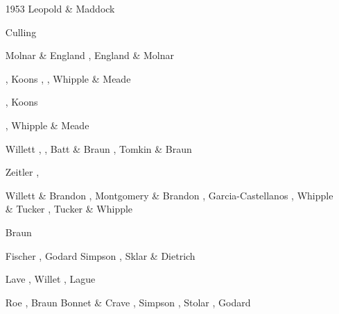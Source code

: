 \begin{scriptsize}
\begin{itemize}
\item [1953] Leopold \& Maddock \cite{lema53}
\item [\nineteensixty] Culling \cite{cull60}
\item [\nineteenninety] Molnar \& England \cite{moen90}, England \& Molnar \cite{enmo90}
\item [\nineteenninetytwo] \cite{befh92}\cite{chas92}
\item [\nineteenninetythree] \cite{povp93}\cite{wibf93}
\item [\nineteenninetyfour] \cite{howa94}, Koons \cite{koon94}, \cite{kobe94}\cite{gikb94}, 
                             Whipple \& Meade \cite{whme04}
\item [\nineteenninetyfive] \cite{chmm95}, Koons \cite{koon95}
\item [\nineteenninetysix] \cite{avbu96}\cite{bekh96}\cite{kobe96},
                     Whipple \& Meade \cite{whme06}
\item [\nineteenninetyseven] \cite{brsa97}\cite{gaft97}\cite{babr97}
\item [\nineteenninetyeight] \cite{deea98}\cite{vabr98}
\item [\nineteenninetynine] Willett \cite{will99a}, \cite{bupi99}, 
                            Batt \& Braun \cite{babr99}, Tomkin \& Braun \cite{tobr99}
\item [\twothousandone] Zeitler \etal \cite{zemk01}, \cite{tulg01}
                 \cite{brsh01}\cite{bupo01}\cite{coul01}\cite{crda01}\cite{moln01}
\item [\twothousandtwo] Willett \& Brandon \cite{wibr02}, Montgomery \& Brandon \cite{mobr02},
                        Garcia-Castellanos \cite{garc02}, Whipple \& Tucker \cite{whtu02}, 
                        Tucker \& Whipple \cite{tuwh02}
\item [\twothousandthree] Braun \cite{brau03}
\item [\twothousandfour] Fischer \etal \cite{fijj04}, Godard \etal \cite{gocl04}
                         Simpson \cite{simp04}, Sklar \& Dietrich \cite{skdi04}
\item [\twothousandfive] Lave \cite{lave05}, Willet \cite{will05}, Lague \etal \cite{lahd05}
\item [\twothousandsix] Roe \etal \cite{rosw06}, Braun \cite{brau06}
                        Bonnet \& Crave \cite{bocr06}, Simpson \cite{simp06},
                        Stolar \etal \cite{stwr06}, Godard \etal \cite{golc06}

\end{itemize}
\end{scriptsize}
